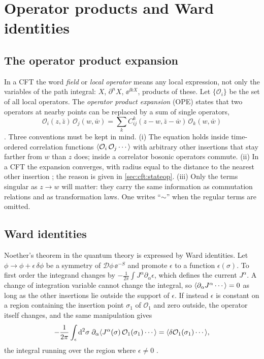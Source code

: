 \section{Operator products and Ward identities}\label{sec:cft:ope}

\subsection{The operator product expansion}

In a CFT the word \emph{field} or \emph{local operator} means any local expression, not only the
variables of the path integral: $X$, $\partial^nX$, $\ee^{\ii kX}$, products of these. Let
$\{\mathcal O_i\}$ be the set of all local operators. The
\emph{operator product expansion} (OPE) states that two
operators at nearby points can be replaced by a sum of single operators,
\begin{equation}\label{eq:cft:ope}
  \mathcal O_i(z,\bar z)\,\mathcal O_j(w,\bar w)=\sum_k C_{ij}^{k}(z-w,\bar z-\bar w)\,
  \mathcal O_k(w,\bar w)
\end{equation}
. Three conventions must be kept in mind. (i) The equation
holds inside time-ordered correlation functions $\langle \mathcal O_i\,\mathcal O_j\cdots\rangle$ with
arbitrary other insertions that stay farther from $w$ than $z$ does; inside a correlator bosonic
operators commute. (ii) In a CFT the expansion converges, with radius equal to the distance to
the nearest other insertion ; the reason is given in
\cref{sec:cft:stateop}. (iii) Only the terms singular as $z\to w$ will matter: they carry the
same information as commutation relations and as transformation laws. One writes ``$\sim$'' when
the regular terms are omitted.

\subsection{Ward identities}

Noether's theorem in the quantum theory is expressed by Ward identities.
Let $\phi\to\phi+\epsilon\,\delta\phi$ be a symmetry of $\mathcal D\phi\,\ee^{-S}$ and promote
$\epsilon$ to a function $\epsilon(\sigma)$. To first order the integrand changes by
$-\frac1{2\pi}\int J^\alpha\partial_\alpha\epsilon$, which defines the current $J^\alpha$. A change
of integration variable cannot change the integral, so $\langle \partial_\alpha J^\alpha\cdots\rangle=0$ as
long as the other insertions lie outside the support of $\epsilon$. If instead $\epsilon$ is
constant on a region containing the insertion point $\sigma_1$ of $\mathcal O_1$ and zero outside,
the operator itself changes, and the same manipulation gives
\begin{equation}\label{eq:cft:ward}
  -\frac1{2\pi}\int_{\epsilon}\mathrm{d}^2\sigma\;\partial_\alpha\langle J^\alpha(\sigma)\,
   \mathcal O_1(\sigma_1)\cdots\rangle=\langle \delta\mathcal O_1(\sigma_1)\cdots\rangle,
\end{equation}
the integral running over the region where $\epsilon\neq0$ .


